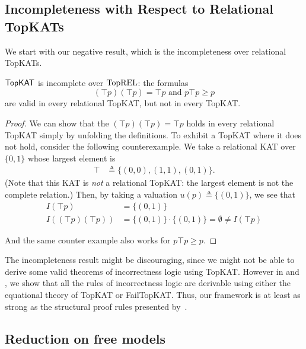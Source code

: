 \subsection{Incompleteness with Respect to Relational TopKATs}

We start with our negative result, which is the incompleteness over relational TopKATs.

\begin{theorem}\label{the: topkatstar incomplete over relational model}
  \(\mathsf{TopKAT}\) is incomplete over \(\mathbf{\mathrm{TopREL}}\): the formulas
  \[(⊤ p) (⊤ p) = ⊤ p \text{ and } p ⊤ p ≥ p\] 
  are valid in every relational TopKAT, but not in every TopKAT\@.
\end{theorem}

\begin{proof}
  We can show that the \((⊤ p) (⊤ p) = ⊤ p\) 
  holds in every relational TopKAT simply by
  unfolding the definitions.  To exhibit a TopKAT where it does not hold,
  consider the following counterexample.  We take a relational KAT over
  \(\{0,1\}\) whose largest element is
  \begin{align*}
    ⊤ & ≜ \{(0,0), (1,1), (0,1)\}.
  \end{align*}
  (Note that this KAT is \emph{not} a relational TopKAT\@: the largest
  element is not the complete relation.)
  Then, by taking a valuation \(u(p) ≜\{(0, 1)\}\), we see that
  \begin{align*}
    I(⊤ p) & = \{(0, 1)\} \\
    I((⊤ p) (⊤ p)) & 
        = \{(0, 1)\} ⋅ \{(0, 1)\} 
        = ∅ ≠ I(⊤ p)
  \end{align*}

  And the same counter example also works for 
  \(p ⊤ p ≥ p\).
\end{proof}

The incompleteness result might be discouraging, since we might not be able to derive some valid theorems of incorrectness logic using TopKAT. However in
 and , we show that all the rules of incorrectness logic are
derivable using either the equational theory of TopKAT or FailTopKAT\@.  Thus,
our framework is at least as strong as the structural proof rules presented
by~\citet{OHearn_2020}.

\subsection{Reduction on free models}\label{sec: reduction on free models}

